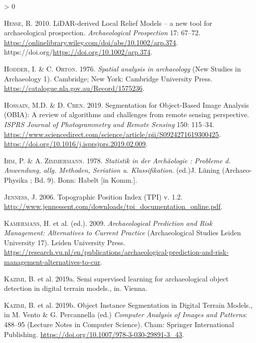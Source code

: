 \documentclass[
  12pt,
]{article}
\newlength{\cslhangindent}
\newenvironment{CSLReferences}[2] %
 {%
  \setlength{\parindent}{0pt}
  \ifodd #1 \everypar{\setlength{\hangindent}{\cslhangindent}}\ignorespaces\fi
  \ifnum #2 > 0
  \setlength{\parskip}{#2\baselineskip}
  \fi
 }%
 {}
\begin{document}
\begin{CSLReferences}{1}{0}
\leavevmode\hypertarget{ref-hesseLiDARderivedLocalRelief2010a}{}%
\textsc{Hesse}, R. 2010. {LiDAR}-derived {Local} {Relief} {Models} -- a new tool for archaeological prospection. \emph{Archaeological Prospection} 17: 67--72. \url{https://onlinelibrary.wiley.com/doi/abs/10.1002/arp.374}. https://doi.org/\url{https://doi.org/10.1002/arp.374}.

\leavevmode\hypertarget{ref-hodderSpatialAnalysisArchaeology1976}{}%
\textsc{Hodder}, I. \& C. \textsc{Orton}. 1976. \emph{Spatial analysis in archaeology} (New Studies in Archaeology 1). Cambridge; New York: Cambridge University Press. \url{https://catalogue.nla.gov.au/Record/1575236}.

\leavevmode\hypertarget{ref-hossainSegmentationObjectBasedImage2019}{}%
\textsc{Hossain}, M.D. \& D. \textsc{Chen}. 2019. Segmentation for {Object}-{Based} {Image} {Analysis} ({OBIA}): {A} review of algorithms and challenges from remote sensing perspective. \emph{ISPRS Journal of Photogrammetry and Remote Sensing} 150: 115--34. \url{https://www.sciencedirect.com/science/article/pii/S0924271619300425}. \url{https://doi.org/10.1016/j.isprsjprs.2019.02.009}.

\leavevmode\hypertarget{ref-ihmStatistikArchaologieProbleme1978}{}%
\textsc{Ihm}, P. \& A. \textsc{Zimmermann}. 1978. \emph{Statistik in der {Archäologie} : {Probleme} d. {Anwendung}, allg. {Methoden}, {Seriation} u. {Klassifikation}}. (ed.)J. Lüning (Archaeo-Physika ; {Bd}. 9). Bonn: Habelt {[}in Komm.{]}.

\leavevmode\hypertarget{ref-jennessTopographicPositionIndex2006}{}%
\textsc{Jenness}, J. 2006. Topographic {Position} {Index} ({TPI}) v. 1.2. \url{http://www.jennessent.com/downloads/tpi_documentation_online.pdf}.

\leavevmode\hypertarget{ref-kamermansArchaeologicalPredictionRisk2009}{}%
\textsc{Kamermans}, H. et al. (ed.). 2009. \emph{Archaeological {Prediction} and {Risk} {Management}: {Alternatives} to {Current} {Practice}} (Archaeological {Studies} {Leiden} {University} 17). Leiden University Press. \url{https://research.vu.nl/en/publications/archaeological-prediction-and-risk-management-alternatives-to-cur}.

\leavevmode\hypertarget{ref-Kazimi2019SemiSL}{}%
\textsc{Kazimi}, B. et al. 2019a. Semi supervised learning for archaeological object detection in digital terrain models., in. Vienna.

\leavevmode\hypertarget{ref-kazimiObjectInstanceSegmentation2019b}{}%
\textsc{Kazimi}, B. et al. 2019b. Object {Instance} {Segmentation} in {Digital} {Terrain} {Models}., in M. Vento \& G. Percannella (ed.) \emph{Computer {Analysis} of {Images} and {Patterns}}: 488--95 (Lecture {Notes} in {Computer} {Science}). Cham: Springer International Publishing. \url{https://doi.org/10.1007/978-3-030-29891-3_43}.


\end{CSLReferences}
\end{document}
